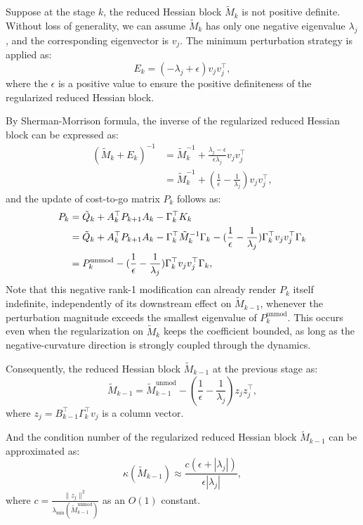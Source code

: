 \documentclass[conference]{IEEEtran}
\theoremstyle{plain}
\begin{document}
Suppose at the stage $k$, the reduced Hessian block $\tilde{M}_k$ is not positive definite.
Without loss of generality, we can assume $\tilde{M}_k$ has only one negative eigenvalue $\lambda_j$, and the corresponding eigenvector is $v_j$.
The minimum perturbation strategy is applied as:
\begin{equation}
    E_k = (-\lambda_{j}+\epsilon) v_j v_j^\top,
\end{equation}
where the $\epsilon$ is a positive value to ensure the positive definiteness of the regularized reduced Hessian block. 

By Sherman-Morrison formula, the inverse of the regularized reduced Hessian block can be expressed as:
\begin{align*}
    (\tilde{M}_k + E_k)^{-1} &= \tilde{M}_k^{-1} + \frac{\lambda_j-\epsilon}{\epsilon \lambda_j} v_j v_j^\top \\
                             &= \tilde{M}_k^{-1} + (\frac{1}{\epsilon} - \frac{1}{\lambda_j}) v_j v_j^\top,
\end{align*}
and the update of cost-to-go matrix $P_k$ follows as:
\begin{align}
    P_k &= \tilde{Q}_k + A_k^\top P_{k+1} A_k - \Gamma_k^\top K_k \notag \\
        &=\tilde{Q}_k + A_k^\top P_{k+1} A_k - \Gamma_k^\top \tilde{M}_k^{-1} \Gamma_k - (\frac{1}{\epsilon} - \frac{1}{\lambda_j}) \Gamma_k^\top v_j v_j^\top \Gamma_k \notag \\
        &= P_k^{\mathrm{unmod}} - (\frac{1}{\epsilon} - \frac{1}{\lambda_j}) \Gamma_k^\top v_j v_j^\top \Gamma_k,
\end{align}
Note that this negative rank-1 modification can already render $P_k$ itself indefinite, 
independently of its downstream effect on $\tilde{M}_{k-1}$, whenever the perturbation 
magnitude exceeds the smallest eigenvalue of $P_k^{\mathrm{unmod}}$. This occurs even 
when the regularization on $\tilde{M}_k$ keeps the coefficient bounded, as long as the 
negative-curvature direction is strongly coupled through the dynamics.

Consequently, the reduced Hessian block $\tilde{M}_{k-1}$ at the previous stage as:
\begin{equation}
    \tilde{M}_{k-1} = \tilde{M}_{k-1}^{\mathrm{unmod}} - (\frac{1}{\epsilon} - \frac{1}{\lambda_j}) z_j z_j^\top,
\end{equation}
where $z_j = B_{k-1}^\top \Gamma_k^\top v_j$ is a column vector.

And the condition number of the regularized reduced Hessian block $\tilde{M}_{k-1}$ can be approximated as:
\begin{equation}
    \kappa(\tilde{M}_{k-1}) \approx \frac{c (\epsilon + |\lambda_j|)}{\epsilon |\lambda_j|},
\end{equation}
where $c = \frac{\|z_j\|^2}{\lambda_{\min}(\tilde{M}_{k-1}^{\mathrm{unmod}})}$ as an $O(1)$ constant.
\end{document}
